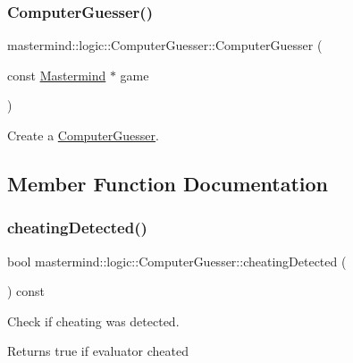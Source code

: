 \subsubsection{\texorpdfstring{Computer\+Guesser()}{ComputerGuesser()}}
{\footnotesize\ttfamily mastermind\+::logic\+::\+Computer\+Guesser\+::\+Computer\+Guesser (\begin{DoxyParamCaption}\item[{const \hyperlink{classmastermind_1_1logic_1_1_mastermind}{Mastermind} $\ast$}]{game }\end{DoxyParamCaption})}



Create a \hyperlink{classmastermind_1_1logic_1_1_computer_guesser}{Computer\+Guesser}. 



\subsection{Member Function Documentation}
\hypertarget{classmastermind_1_1logic_1_1_computer_guesser_ae93df46297030bcbd924f5ddc4af4889}{}\label{classmastermind_1_1logic_1_1_computer_guesser_ae93df46297030bcbd924f5ddc4af4889} 
\subsubsection{\texorpdfstring{cheating\+Detected()}{cheatingDetected()}}
{\footnotesize\ttfamily bool mastermind\+::logic\+::\+Computer\+Guesser\+::cheating\+Detected (\begin{DoxyParamCaption}{ }\end{DoxyParamCaption}) const}



Check if cheating was detected. 

\begin{DoxyReturn}{Returns}
{\ttfamily true} if evaluator cheated 
\end{DoxyReturn}
\hypertarget{classmastermind_1_1logic_1_1_computer_guesser_aa7c627d1d8ac073cc40e5693064e58c9}{}\label{classmastermind_1_1logic_1_1_computer_guesser_aa7c627d1d8ac073cc40e5693064e58c9} 
